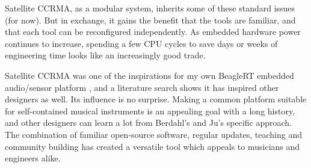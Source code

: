 Satellite CCRMA, as a modular system, inherits some of these standard issues (for now). But in exchange, it gains the benefit that the tools are familiar, and that each tool can be reconfigured independently. As embedded hardware power continues to increase, spending a few CPU cycles to save days or weeks of engineering time looks like an increasingly good trade.

Satellite CCRMA was one of the inspirations for my own BeagleRT embedded audio/sensor platform \cite{McPherson:2015}, and a literature search shows it has inspired other designers as well. Its influence is no surprise. Making a common platform suitable for self-contained musical instruments is an appealing goal with a long history, and other designers can learn a lot from Berdahl's and Ju's specific approach. The combination of familiar open-source software, regular updates, teaching and community building has created a versatile tool which appeals to musicians and engineers alike. 


